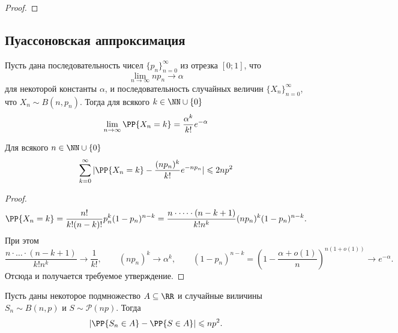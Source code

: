 \documentclass[12pt,a4paper]{article}
\begin{document}
    \begin{proof}
    \end{proof}

    \subsection{Пуассоновская аппроксимация}

    \begin{theorem}
        Пусть дана последовательность чисел $\{p_n\}_{n=0}^\infty$ из отрезка $[0; 1]$, что
        \[\lim_{n \to \infty} n p_n \to \alpha\]
        для некоторой константы $\alpha$, и последовательность случайных величин $\{X_n\}_{n=0}^\infty$, что $X_n \sim B(n, p_n)$. Тогда для всякого $k \in \NN \cup \{0\}$
        \[\lim_{n \to \infty} \PP\{X_n = k\} = \frac{\alpha^k}{k!}e^{-\alpha}\]
            \item Для всякого $n \in \NN \cup \{0\}$
                \[\sum_{k=0}^\infty |\PP\{X_n = k\} - \frac{(np_n)^k}{k!} e^{-np_n}| \leqslant 2np^2\]
            \item 
    \end{theorem}

    \begin{proof}
        \[
            \PP\{X_n = k\}
            = \frac{n!}{k! (n-k)!} p_n^k (1-p_n)^{n-k}
            = \frac{n \cdot \dots \cdot (n-k+1)}{k! n^k} (np_n)^k (1-p_n)^{n-k}.
        \]
        При этом
        \[
            \frac{n \cdot \dots \cdot (n-k+1)}{k! n^k} \to \frac{1}{k!},
            \qquad
            (np_n)^k \to \alpha^k,
            \qquad (1-p_n)^{n-k} = \left(1 - \frac{\alpha + o(1)}{n}\right)^{n(1 + o(1))}
            \to e^{-\alpha}.
        \]
        Отсюда и получается требуемое утверждение.
    \end{proof}

    \begin{theorem}
        Пусть даны некоторое подмножество $A \subseteq \RR$ и случайные виличины $S_n \sim B(n, p)$ и $S \sim \mathcal{P}(np)$. Тогда
        \[|\PP\{S_n \in A\} - \PP\{S \in A\}| \leqslant np^2.\]
    \end{theorem}
\end{document}
